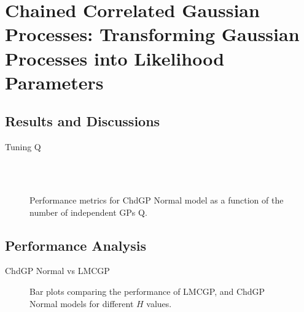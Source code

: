 \section[Chained Correlated Gaussian Processes]{Chained Correlated Gaussian Processes: Transforming Gaussian Processes into Likelihood Parameters}

\subsection{Results and Discussions}

\begin{frame}{Tuning Q}
	\begin{figure}[htbp]
		\centering
		\setlength{} 
		\setlength{}
		\subfloat[CRPS]{}
		\subfloat[MSE]{}\\
		\vspace{-0.2cm}
		\subfloat[MSLL]{}
		\subfloat[NLPD]{}\\
		\vspace{-0.5cm}
		\caption{Performance metrics for ChdGP Normal model as a function of the number of independent GPs Q.}
	\end{figure}
\end{frame}

\subsection{Performance Analysis}
\begin{frame}{ChdGP Normal vs LMCGP}
	\begin{figure}[htbp]
		\centering
		\setlength{}
		\setlength{}
		
		\subfloat[NLPD]{}
		\hfill
		\subfloat[MSLL]{}
		
		\caption{Bar plots comparing the performance of LMCGP, and ChdGP Normal models for different \(H\) values.}
	\end{figure}
\end{frame}

